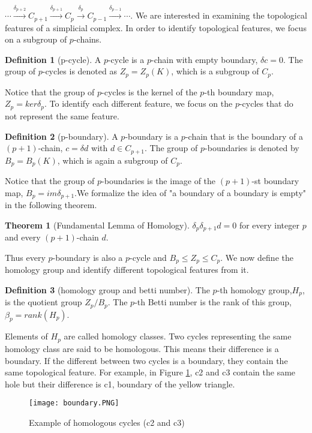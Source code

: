 \documentclass[12pt]{article}
\theoremstyle{definition}
\newtheorem{definition}{Definition}
\newtheorem{theorem}{Theorem}
\begin{document}
$\cdots \overset{\delta_{p+2}}{\longrightarrow}C_{p+1}\overset{\delta_{p+1}}{\longrightarrow}C_p\overset{\delta_p}{\longrightarrow}C_{p-1}\overset{\delta_{p-1}}{\longrightarrow}\cdots$. We are interested in examining the topological features of a simplicial complex. In order to identify topological features, we focus on a subgroup of $p$-chains.
\begin{definition}[p-cycle]
A $p$-cycle is a $p$-chain with empty boundary, $\delta c=0$. The group of $p$-cycles is denoted as $Z_p = Z_p(K)$, which is a subgroup of $C_p$.
\end{definition}
Notice that the group of $p$-cycles is the kernel of the $p$-th boundary map, $Z_p = ker\delta_p$. To identify each different feature, we focus on the $p$-cycles that do not represent the same feature.
\begin{definition}[p-boundary]
A $p$-boundary is a $p$-chain that is the boundary of a $(p + 1)$-chain, $c = \delta d$ with $d \in C_{p+1}$. The group of $p$-boundaries is denoted by $B_p = B_p(K)$, which is again a subgroup of $C_p$.
\end{definition}
Notice that the group of $p$-boundaries is the image of the $(p+1)$-st boundary map, $B_p = im\delta_{p+1}$.We formalize the idea of "a boundary of a boundary is empty" in the following theorem.
\begin{theorem}[Fundamental Lemma of Homology]
$\delta_p\delta_{p+1}d=0$ for every integer $p$
and every $(p+1)$-chain $d$.
\end{theorem}
Thus every $p$-boundary is also a $p$-cycle and $B_p \leq Z_p \leq C_p$. We now define the homology group and identify different topological features from it.
\begin{definition}[homology group and betti number]
The $p$-th homology group,$H_p$, is the quotient group $Z_p/B_p$. The $p$-th Betti number is the rank of this group, $\beta_p = rank(H_p)$.
\end{definition}

Elements of $H_p$ are called homology classes. Two cycles representing the same homology class are said
to be homologous. This means their difference is a boundary.\cite{hatcher2002algebraictopology} If the different between two cycles is a boundary, they contain the same topological feature. For example, in Figure \ref{boundary}, c2 and c3 contain the same hole but their difference is c1, boundary of the yellow triangle.

\begin{figure}[h]
\centering
\texttt{[image: boundary.PNG]}
\caption{Example of homologous cycles (c2 and c3) \cite{zhu2013language}}
\label{boundary}
\end{figure}
\end{document}
